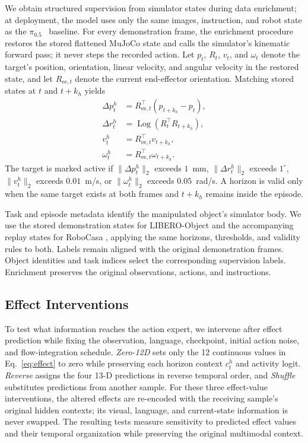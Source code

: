 \documentclass[letterpaper,10pt,conference]{ieeeconf}
\newcommand{\pihalf}{\ensuremath{\pi_{0.5}}}
\begin{document}
We obtain structured supervision from simulator states during data enrichment; at deployment, the model uses only the same images, instruction, and robot state as the \pihalf{}~\cite{pi05} baseline.
For every demonstration frame, the enrichment procedure restores the stored flattened MuJoCo state and calls the simulator's kinematic forward pass; it never steps the recorded action.
Let $p_t$, $R_t$, $v_t$, and $\omega_t$ denote the target's position, orientation, linear velocity, and angular velocity in the restored state, and let $R_{\mathrm{ee},t}$ denote the current end-effector orientation.
Matching stored states at $t$ and $t+k_h$ yields
\begin{align}
\Delta p_t^h &= R_{\mathrm{ee},t}^{\top}(p_{t+k_h}-p_t), \\
\Delta r_t^h &= \operatorname{Log}(R_t^{\top}R_{t+k_h}), \\
v_t^h &= R_{\mathrm{ee},t}^{\top}v_{t+k_h}, \\
\omega_t^h &= R_{\mathrm{ee},t}^{\top}\omega_{t+k_h}.
\label{eq:effect_labels}
\end{align}
The target is marked active if $\|\Delta p_t^h\|_2$ exceeds $1$~mm, $\|\Delta r_t^h\|_2$ exceeds $1^{\circ}$, $\|v_t^h\|_2$ exceeds $0.01$~m/s, or $\|\omega_t^h\|_2$ exceeds $0.05$~rad/s.
A horizon is valid only when the same target exists at both frames and $t+k_h$ remains inside the episode.

Task and episode metadata identify the manipulated object's simulator body.
We use the stored demonstration states for LIBERO-Object \cite{libero} and the accompanying replay states for RoboCasa \cite{robocasa2024}, applying the same horizons, thresholds, and validity rules to both.
Labels remain aligned with the original demonstration frames.
Object identities and task indices select the corresponding supervision labels.
Enrichment preserves the original observations, actions, and instructions.

\subsection{Effect Interventions}

To test what information reaches the action expert, we intervene after effect prediction while fixing the observation, language, checkpoint, initial action noise, and flow-integration schedule.
\emph{Zero-12D} sets only the 12 continuous values in Eq.~\eqref{eq:effect} to zero while preserving each horizon context $c_t^h$ and activity logit.
\emph{Reverse} assigns the four 13-D predictions in reverse temporal order, and \emph{Shuffle} substitutes predictions from another sample.
For these three effect-value interventions, the altered effects are re-encoded with the receiving sample's original hidden contexts; its visual, language, and current-state information is never swapped.
The resulting tests measure sensitivity to predicted effect values and their temporal organization while preserving the original multimodal context.
\end{document}
